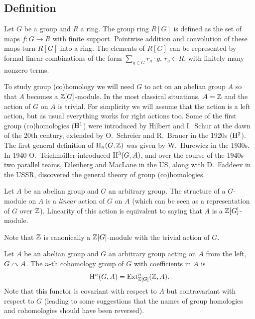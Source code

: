 \subsection{Definition}


\begin{defn}
    Let $G$ be a group and $R$ a ring. The group ring $R[G]$ is defined as the set of maps $f:G\to R$ with finite support. Pointwise addition and convolution of these maps turn $R[G]$ into a ring. The elements of $R[G]$ can be represented by formal linear combinations of the form $\sum_{g\in G} r_g\cdot g$, $r_g\in R$, with finitely many nonzero terms.
\end{defn}

To study group (co)homology we will need $G$ to act on an abelian group $A$ so that $A$ becomes a $\mathbb{Z}[G]$-module. In the most classical situations, $A=\mathbb{Z}$ and the action of $G$ on $A$ is trivial. For simplicity we will assume that the action is a left action, but as usual everything works for right actions too. Some of the first group (co)homologies ($\mathrm{H}^1$) were introduced by Hilbert and I.~Schur at the dawn of the 20th century, extended by O.~Schreier and R.~Brauer in the 1920s ($\mathrm{H}^2$). The first general definition of $\mathrm{H}_n(G,\mathbb{Z})$ was given by W.~Hurewicz in the 1930s. In 1940 O.~Teichm\"uller introduced $\mathrm{H}^3(G,A)$, and over the course of the 1940s two parallel teams, Eilenberg and MacLane in the US, along with D.~Faddeev in the USSR, discovered the general theory of group (co)homologies.

\begin{defn}[$G$-module]
    Let $A$ be an abelian group and $G$ an arbitrary group. The structure of a $G$-module on $A$ is a \emph{linear} action of $G$ on $A$ (which can be seen as a representation of $G$ over $\mathbb{Z}$). Linearity of this action is equivalent to saying that $A$ is a $\mathbb{Z}[G]$-module.

    Note that $\mathbb{Z}$ is canonically a $\mathbb{Z}[G]$-module with the trivial action of $G$.
\end{defn}

\begin{defn}
    Let $A$ be an abelian group and $G$ an arbitrary group acting on $A$ from the left, $G\curvearrowright A$. The $n$-th cohomology group of $G$ with coefficients in $A$ is
    \[\mathrm{H}^n(G,A)=\operatorname{Ext}_{\mathbb{Z}[G]}^n(\mathbb{Z},A).\]
    Note that this functor is covariant with respect to $A$ but contravariant with respect to $G$ (leading to some suggestions that the names of group homologies and cohomologies should have been reversed). 
\end{defn}

